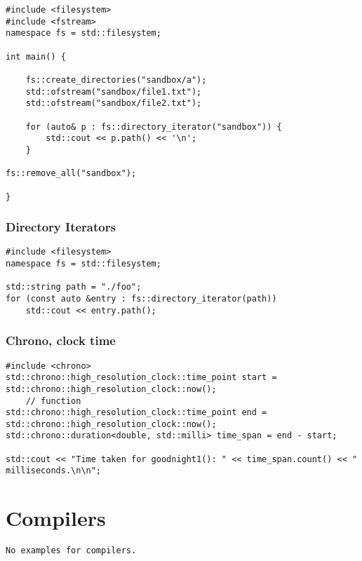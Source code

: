 \begin{verbatim}
#include <filesystem>
#include <fstream>
namespace fs = std::filesystem;

int main() {

    fs::create_directories("sandbox/a");
    std::ofstream("sandbox/file1.txt");
    std::ofstream("sandbox/file2.txt");

    for (auto& p : fs::directory_iterator("sandbox")) {
        std::cout << p.path() << '\n';
    } 

fs::remove_all("sandbox");

}
\end{verbatim}

\subsection{Directory Iterators}

\begin{verbatim}
#include <filesystem>
namespace fs = std::filesystem;

std::string path = "./foo";
for (const auto &entry : fs::directory_iterator(path))
    std::cout << entry.path();
\end{verbatim}

\subsection{Chrono, clock time}

\begin{verbatim}
#include <chrono>
std::chrono::high_resolution_clock::time_point start = std::chrono::high_resolution_clock::now();
    // function
std::chrono::high_resolution_clock::time_point end = std::chrono::high_resolution_clock::now();
std::chrono::duration<double, std::milli> time_span = end - start;

std::cout << "Time taken for goodnight1(): " << time_span.count() << " milliseconds.\n\n";
\end{verbatim}

\chapter{Compilers}
\begin{verbatim}
No examples for compilers.
\end{verbatim}

